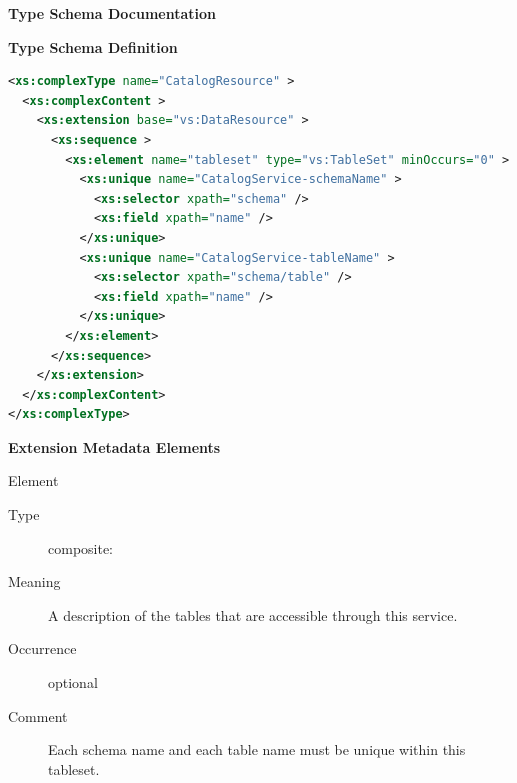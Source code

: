 \documentclass[11pt,a4paper]{ivoa}
\begin{document}
\begin{generated}
\begingroup
      	\renewcommand*\descriptionlabel[1]{%
      	\hbox to 5.5em{\emph{#1}\hfil}}\vspace{2ex}\noindent\textbf{ Type Schema Documentation}



\vspace{1ex}\noindent\textbf{ Type Schema Definition}

\begin{lstlisting}[language=XML,basicstyle=\footnotesize]
<xs:complexType name="CatalogResource" >
  <xs:complexContent >
    <xs:extension base="vs:DataResource" >
      <xs:sequence >
        <xs:element name="tableset" type="vs:TableSet" minOccurs="0" >
          <xs:unique name="CatalogService-schemaName" >
            <xs:selector xpath="schema" />
            <xs:field xpath="name" />
          </xs:unique>
          <xs:unique name="CatalogService-tableName" >
            <xs:selector xpath="schema/table" />
            <xs:field xpath="name" />
          </xs:unique>
        </xs:element>
      </xs:sequence>
    </xs:extension>
  </xs:complexContent>
</xs:complexType>
\end{lstlisting}

\vspace{0.5ex}\noindent\textbf{ Extension Metadata Elements}

\begingroup\small\begin{bigdescription}\item[Element \xmlel{tableset}]
\begin{description}
\item[Type] composite: 
\item[Meaning] 
                       A description of the tables that are accessible
                       through this service.
                     
\item[Occurrence] optional
\item[Comment] 
                       Each schema name and each table name must be
                       unique within this tableset.
                     

\end{description}


\end{bigdescription}\endgroup

\endgroup
\end{generated}
\end{document}
